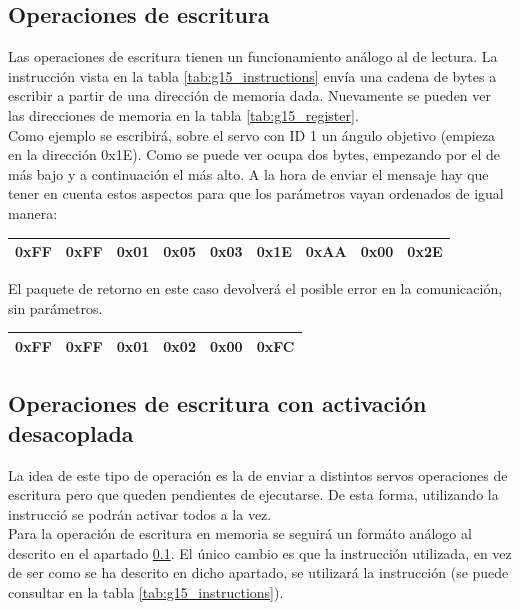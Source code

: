 	\subsection{Operaciones de escritura} \label{subsec:registros:operaciones:escritura}

	Las operaciones de escritura tienen un funcionamiento análogo al de lectura. La instrucción  vista en la tabla \ref{tab:g15_instructions} envía una cadena de bytes a escribir a partir de una dirección de memoria dada. Nuevamente se pueden ver las direcciones de memoria en la tabla \ref{tab:g15_register}.
	\\

	Como ejemplo se escribirá, sobre el servo con ID 1 un ángulo objetivo (empieza en la dirección 0x1E). Como se puede ver ocupa dos bytes, empezando por el de más bajo y a continuación el más alto. A la hora de enviar el mensaje hay que tener en cuenta estos aspectos para que los parámetros vayan ordenados de igual manera:

	\begin{center}
		\begin{tabular}{|c|c|c|c|c|c|c|c|c|}
			\hline
			0xFF & 0xFF & 0x01 & 0x05 & 0x03 & 0x1E & 0xAA & 0x00 &0x2E  \\
			\hline
		\end{tabular}
	\end{center}

	El paquete de retorno en este caso devolverá el posible error en la comunicación, sin parámetros.
	\begin{center}
		\begin{tabular}{|c|c|c|c|c|c|}
			\hline
			0xFF & 0xFF & 0x01 & 0x02 & 0x00 & 0xFC \\
			\hline
		\end{tabular}
	\end{center}

	\subsection{Operaciones de escritura con activación desacoplada}

		La idea de este tipo de operación es la de enviar a distintos servos operaciones de escritura pero que queden pendientes de ejecutarse. De esta forma, utilizando la instrucció  se podrán activar todos a la vez.
		\\

		Para la operación de escritura en memoria se seguirá un formáto análogo al descrito en el apartado \ref{subsec:registros:operaciones:escritura}. El único cambio es que la instrucción utilizada, en vez de ser  como se ha descrito en dicho apartado, se utilizará la instrucción  (se puede consultar en la tabla \ref{tab:g15_instructions}).
		\\

